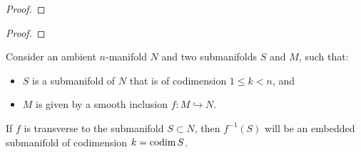             \begin{proof}
                
            \end{proof}
        \begin{corollary} \label{coro: base_changing_submersive_unramified_and_etale_morphisms}
            
        \end{corollary}
            \begin{proof}
                
            \end{proof}

        \begin{lemma}
            Consider an ambient $n$-manifold $N$ and two submanifolds $S$ and $M$, such that:
            \begin{itemize}
                \item $S$ is a submanifold of $N$ that is of codimension $1 \leq k < n$, and
                \item $M$ is given by a smooth inclusion $f: M \hookrightarrow N$.
            \end{itemize}
            If $f$ is transverse to the submanifold $S \subset N$, then $f^{-1}(S)$ will be an embedded submanifold of codimension $k = \operatorname{codim} S$.
        \end{lemma}
